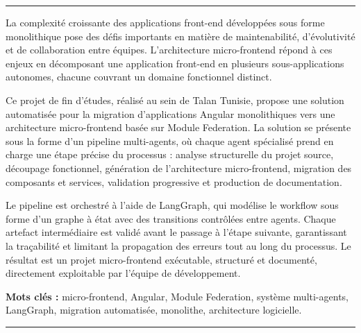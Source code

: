 \noindent\rule{\linewidth}{1pt}
\vspace{0.3cm}

\noindent La complexité croissante des applications front-end développées sous forme monolithique pose des défis importants en matière de maintenabilité, d'évolutivité et de collaboration entre équipes. L'architecture micro-frontend répond à ces enjeux en décomposant une application front-end en plusieurs sous-applications autonomes, chacune couvrant un domaine fonctionnel distinct.

\medskip

\noindent Ce projet de fin d'études, réalisé au sein de Talan Tunisie, propose une solution automatisée pour la migration d'applications Angular monolithiques vers une architecture micro-frontend basée sur Module Federation. La solution se présente sous la forme d'un pipeline multi-agents, où chaque agent spécialisé prend en charge une étape précise du processus : analyse structurelle du projet source, découpage fonctionnel, génération de l'architecture micro-frontend, migration des composants et services, validation progressive et production de documentation.

\medskip

\noindent Le pipeline est orchestré à l'aide de LangGraph, qui modélise le workflow sous forme d'un graphe à état avec des transitions contrôlées entre agents. Chaque artefact intermédiaire est validé avant le passage à l'étape suivante, garantissant la traçabilité et limitant la propagation des erreurs tout au long du processus. Le résultat est un projet micro-frontend exécutable, structuré et documenté, directement exploitable par l'équipe de développement.

\vspace{0.5cm}

\noindent\textbf{Mots clés :} micro-frontend, Angular, Module Federation, système multi-agents, LangGraph, migration automatisée, monolithe, architecture logicielle.

\vspace{0.4cm}
\noindent\rule{\linewidth}{1pt}
